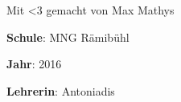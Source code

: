 {\Large Mit <3 gemacht von Max Mathys}

\vspace{.7em}

\textbf{Schule}: MNG Rämibühl
\vspace{.2em}

\textbf{Jahr}: 2016
\vspace{.2em}

\textbf{Lehrerin}: Antoniadis